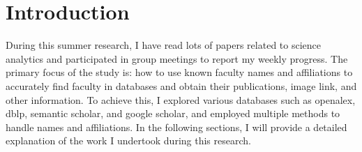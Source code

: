 \documentclass[../report.tex]{subfiles}
\begin{document}
\section{Introduction}

\hspace{0.5cm} During this summer research, I have read lots of papers related to science analytics and participated in group meetings to report my weekly progress. The primary focus of the study is: how to use known faculty names and affiliations to accurately find faculty in databases and obtain their publications, image link, and other information. To achieve this, I explored various databases such as openalex, dblp, semantic scholar, and google scholar, and employed multiple methods to handle names and affiliations. In the following sections, I will provide a detailed explanation of the work I undertook during this research.
\end{document}
